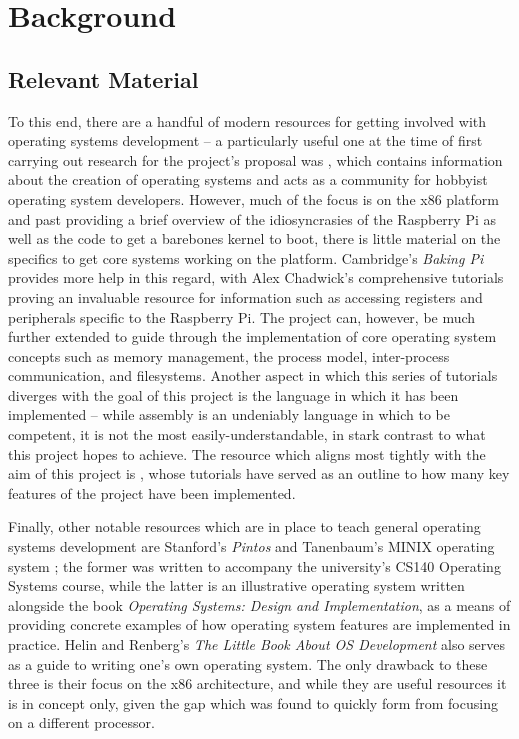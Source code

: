 \section{Background}
\subsection{Relevant Material}
    To this end, there are a handful of modern resources for getting involved
    with operating systems development -- a particularly useful one at the time
    of first carrying out research for the project's proposal was
    , which contains information about the creation of
    operating systems and acts as a community for hobbyist operating system
    developers. However, much of the focus is on the x86 platform and past
    providing a brief overview of the idiosyncrasies of the Raspberry Pi as well
    as the code to get a barebones kernel to boot, there is little material on
    the specifics to get core systems working on the platform.  Cambridge's
    \textit{Baking Pi} \cite{BakingPi} provides more help in this regard, with
    Alex Chadwick's comprehensive tutorials proving an invaluable resource for
    information such as accessing registers and peripherals specific to the
    Raspberry Pi. The project can, however, be much further extended to guide
    through the implementation of core operating system concepts such as memory
    management, the process model, inter-process communication, and filesystems.
    Another aspect in which this series of tutorials diverges with the goal of
    this project is the language in which it has been implemented -- while
    assembly is an undeniably language in which to be competent, it is not the
    most easily-understandable, in stark contrast to what this project hopes to
    achieve. The resource which aligns most tightly with the aim of this project
    is \cite{jsandler}, whose tutorials have served as an outline to how many
    key features of the project have been implemented.
    
    Finally, other notable resources which are in place to teach general
    operating systems development are Stanford's \textit{Pintos} \cite{Pintos}
    and Tanenbaum's MINIX operating system \cite{MINIX}; the former was written
    to accompany the university's CS140 Operating Systems course, while the
    latter is an illustrative operating system written alongside the book
    \textit{Operating Systems: Design and Implementation}, as a means of
    providing concrete examples of how operating system features are implemented
    in practice. Helin and Renberg's \textit{The Little Book About OS
    Development} \cite{littleosbook} also serves as a guide to writing one's own
    operating system. The only drawback to these three is their focus on the x86
    architecture, and while they are useful resources it is in concept only,
    given the gap which was found to quickly form from focusing on a different
    processor.


